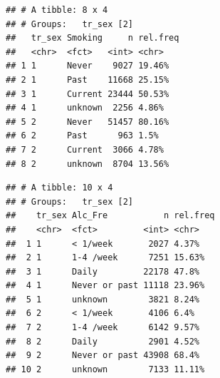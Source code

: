 \documentclass[]{article}
\newenvironment{Shaded}{\begin{snugshade}}{\end{snugshade}}
\newcommand{\DataTypeTok}[1]{\textcolor[rgb]{0.13,0.29,0.53}{#1}}
\newcommand{\DecValTok}[1]{\textcolor[rgb]{0.00,0.00,0.81}{#1}}
\newcommand{\KeywordTok}[1]{\textcolor[rgb]{0.13,0.29,0.53}{\textbf{#1}}}
\newcommand{\NormalTok}[1]{#1}
\newcommand{\OperatorTok}[1]{\textcolor[rgb]{0.81,0.36,0.00}{\textbf{#1}}}
\newcommand{\OtherTok}[1]{\textcolor[rgb]{0.56,0.35,0.01}{#1}}
\newcommand{\StringTok}[1]{\textcolor[rgb]{0.31,0.60,0.02}{#1}}
\begin{document}
\begin{verbatim}
## # A tibble: 8 x 4
## # Groups:   tr_sex [2]
##   tr_sex Smoking     n rel.freq
##   <chr>  <fct>   <int> <chr>   
## 1 1      Never    9027 19.46%  
## 2 1      Past    11668 25.15%  
## 3 1      Current 23444 50.53%  
## 4 1      unknown  2256 4.86%   
## 5 2      Never   51457 80.16%  
## 6 2      Past      963 1.5%    
## 7 2      Current  3066 4.78%   
## 8 2      unknown  8704 13.56%
\end{verbatim}

\begin{Shaded}
\end{Shaded}

\begin{verbatim}
## # A tibble: 10 x 4
## # Groups:   tr_sex [2]
##    tr_sex Alc_Fre           n rel.freq
##    <chr>  <fct>         <int> <chr>   
##  1 1      < 1/week       2027 4.37%   
##  2 1      1-4 /week      7251 15.63%  
##  3 1      Daily         22178 47.8%   
##  4 1      Never or past 11118 23.96%  
##  5 1      unknown        3821 8.24%   
##  6 2      < 1/week       4106 6.4%    
##  7 2      1-4 /week      6142 9.57%   
##  8 2      Daily          2901 4.52%   
##  9 2      Never or past 43908 68.4%   
## 10 2      unknown        7133 11.11%
\end{verbatim}

\begin{Shaded}
\end{Shaded}
\end{document}
